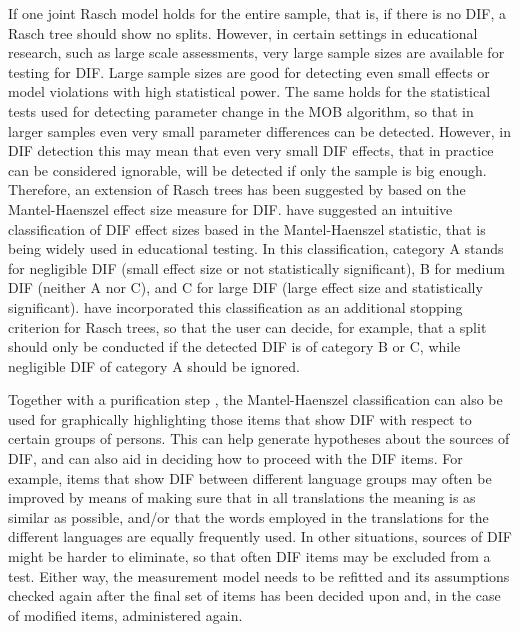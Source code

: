 \documentclass[doc,floatsintext,natbib]{apa7}
\begin{document}
If one joint Rasch model holds for the entire sample, that is, if there is no DIF, a Rasch tree should show no splits. However, in certain settings in educational research, such as large scale assessments, very large sample sizes are available for testing for DIF. Large sample sizes are good for detecting even small effects or model violations with high statistical power. The same holds for the statistical tests used for detecting parameter change in the MOB algorithm, so that in larger samples even very small parameter differences can be detected. However, in DIF detection this may mean that even very small DIF effects, that in practice can be considered ignorable, will be detected if only the sample is big enough. %
Therefore, an extension of Rasch trees has been suggested by \citet{HennyDeba23} based on the Mantel-Haenszel effect size measure for DIF. \citet{HolTha:1985} have suggested an intuitive classification of DIF effect sizes based in the Mantel-Haenszel statistic, that is being widely used in educational testing. In this classification, category A stands for negligible DIF (small effect size or not statistically significant), B for medium DIF (neither A nor C), and C for large DIF (large effect size and statistically significant). \citet{HennyDeba23} have incorporated this classification as an additional stopping criterion for Rasch trees, so that the user can decide, for example, that a split should only be conducted if the detected DIF is of category B or C, while negligible DIF of category A should be ignored. 

Together with a purification step \citep[see][for details]{HennyDeba23}, the Mantel-Haenszel classification can also be used for graphically highlighting those items that show DIF with respect to certain groups of persons. This can help generate hypotheses about the sources of DIF, and can also aid in deciding how to proceed with the DIF items. 
For example, items that show DIF between different language groups may often be improved by means of making sure that in all translations the meaning is as similar as possible, and/or that the words employed in the translations for the different languages are equally frequently used. In other situations, sources of DIF might be harder to eliminate, so that often DIF items may be excluded from a test. Either way, the measurement model needs to be refitted and its assumptions checked again after the final set of items has been decided upon and, in the case of modified items, administered again. 
\end{document}
